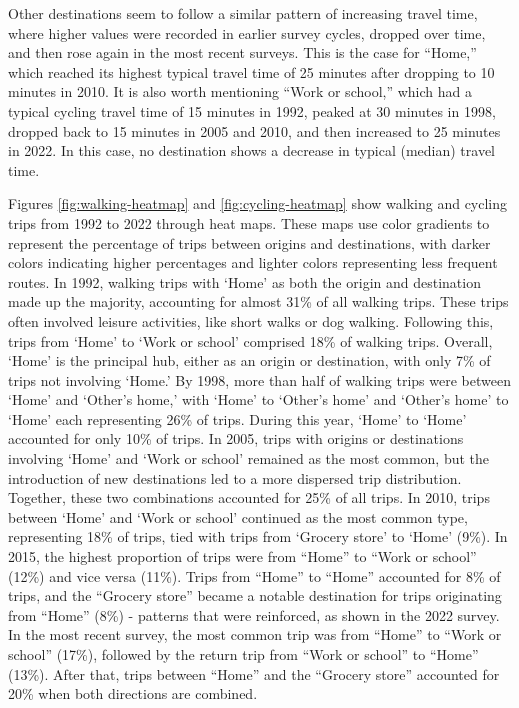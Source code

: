 \documentclass[preprint, 3p,
authoryear]{elsarticle} %
\begin{document}
Other destinations seem to follow a similar pattern of increasing travel
time, where higher values were recorded in earlier survey cycles,
dropped over time, and then rose again in the most recent surveys. This
is the case for ``Home,'' which reached its highest typical travel time
of 25 minutes after dropping to 10 minutes in 2010. It is also worth
mentioning ``Work or school,'' which had a typical cycling travel time
of 15 minutes in 1992, peaked at 30 minutes in 1998, dropped back to 15
minutes in 2005 and 2010, and then increased to 25 minutes in 2022. In
this case, no destination shows a decrease in typical (median) travel
time.

Figures \ref{fig:walking-heatmap} and \ref{fig:cycling-heatmap} show
walking and cycling trips from 1992 to 2022 through heat maps. These
maps use color gradients to represent the percentage of trips between
origins and destinations, with darker colors indicating higher
percentages and lighter colors representing less frequent routes. In
1992, walking trips with `Home' as both the origin and destination made
up the majority, accounting for almost 31\% of all walking trips. These
trips often involved leisure activities, like short walks or dog
walking. Following this, trips from `Home' to `Work or school' comprised
18\% of walking trips. Overall, `Home' is the principal hub, either as
an origin or destination, with only 7\% of trips not involving `Home.'
By 1998, more than half of walking trips were between `Home' and
`Other's home,' with `Home' to `Other's home' and `Other's home' to
`Home' each representing 26\% of trips. During this year, `Home' to
`Home' accounted for only 10\% of trips. In 2005, trips with origins or
destinations involving `Home' and `Work or school' remained as the most
common, but the introduction of new destinations led to a more dispersed
trip distribution. Together, these two combinations accounted for 25\%
of all trips. In 2010, trips between `Home' and `Work or school'
continued as the most common type, representing 18\% of trips, tied with
trips from `Grocery store' to `Home' (9\%). In 2015, the highest
proportion of trips were from ``Home'' to ``Work or school'' (12\%) and
vice versa (11\%). Trips from ``Home'' to ``Home'' accounted for 8\% of
trips, and the ``Grocery store'' became a notable destination for trips
originating from ``Home'' (8\%) - patterns that were reinforced, as
shown in the 2022 survey. In the most recent survey, the most common
trip was from ``Home'' to ``Work or school'' (17\%), followed by the
return trip from ``Work or school'' to ``Home'' (13\%). After that,
trips between ``Home'' and the ``Grocery store'' accounted for 20\% when
both directions are combined.
\end{document}
